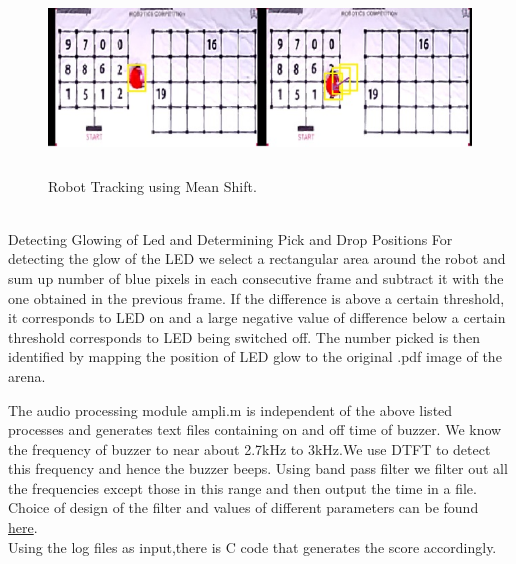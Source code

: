 \documentclass[a4paper,12pt,oneside]{book}
\begin{document}
    \begin{figure}[h!]
		\includegraphics[width=1\linewidth, height=5cm]{ROI1.jpg}
		\centering
		\caption{Robot Tracking using Mean Shift.}
	\end{figure}\\
Detecting Glowing of Led and Determining Pick and Drop Positions
For detecting the glow of the LED we select a rectangular area around the robot and sum up number of blue pixels in each consecutive frame and subtract it with the one obtained in the previous frame. If the difference is above a certain threshold, it corresponds to LED on and a large negative value of difference below a certain threshold corresponds to LED being switched off. The number picked is then identified by mapping the position of LED glow to the original .pdf image of the arena.  

The audio processing module ampli.m is independent of the above listed processes and generates text files containing on and off time of buzzer.
We know the frequency of buzzer to near about 2.7kHz to 3kHz.We use DTFT to detect this frequency and hence the buzzer beeps. Using band pass filter we filter out all the frequencies except those in this range and then output the time in a file. Choice of design of the filter and values of different parameters can be found \href{http://in.mathworks.com/help/dsp/ref/bandpassfilter.html}{here}.\\
Using the log files as input,there is C code that generates the score accordingly.
\end{document}
